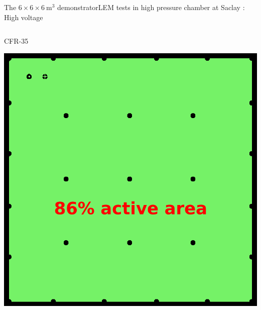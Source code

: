 \documentclass[10pt]{beamer}
\begin{document}
\begin{frame}{The \texorpdfstring{$6 \times 6 \times \SI{6}{\meter\cubed}$}{666} demonstrator}{LEM tests in high pressure chamber at Saclay : High voltage}
\begin{columns}
\begin{column}{0.5\textwidth}
\begin{minipage}{0.48\textwidth}
    			\end{minipage}\hfill
    			\begin{minipage}{0.48\textwidth}
    				\centering
    				\begin{scriptsize}
	    				CFR-35
    				\end{scriptsize}
    				\includegraphics[width=.9\textwidth]{figures/666/CFR-35.png}
    			\end{minipage}
    		\end{column}
    	\end{columns}
    \end{frame}
    
\end{document}

